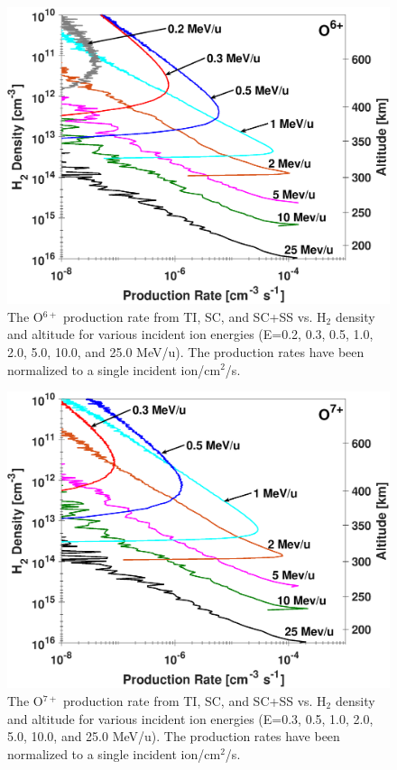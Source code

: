 \documentclass[draft]{agujournal2018}
\begin{document}
\begin{figure}[ht]
    \centering
    \includegraphics[width=\textwidth]{Figures/O6CXProd.eps}
    \caption{The O$^{6+}$ production rate from TI, SC, and SC+SS vs. H$_2$ density and altitude for various incident ion energies (E=0.2, 0.3, 0.5, 1.0, 2.0, 5.0, 10.0, and 25.0 MeV/u). The production rates have been normalized to a single incident ion/cm$^2$/s.}
    \label{fig:O6+Prod}
\end{figure}

\begin{figure}[ht]
    \centering
    \includegraphics[width=\textwidth]{Figures/O7CXProd.eps}
    \caption{The O$^{7+}$ production rate from TI, SC, and SC+SS vs. H$_2$ density and altitude for various incident ion energies (E=0.3, 0.5, 1.0, 2.0, 5.0, 10.0, and 25.0 MeV/u). The production rates have been normalized to a single incident ion/cm$^2$/s.}
    \label{fig:O7+Prod}
\end{figure}
\end{document}
